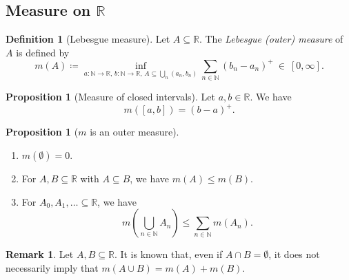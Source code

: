 \documentclass{article}
\theoremstyle{definition}
\newtheorem{proposition}[theorem]{Proposition}
\newtheorem{definition}[theorem]{Definition}
\newtheorem{remark}[theorem]{Remark}
\begin{document}
\subsection{Measure on $\mathbb{R}$}

\begin{definition}[Lebesgue measure]
  Let $A \subseteq \mathbb{R}$.
  The \emph{Lebesgue (outer) measure} of $A$ is defined by
  \begin{equation*}
    m (A) \coloneqq 
      \inf_{a : \mathbb{N} \to \mathbb{R},\, b : \mathbb{N} \to \mathbb{R},\, 
        A \subseteq \bigcup_{n} (a_n, b_n)}
      \sum_{n \in \mathbb{N}} (b_n - a_n)^+ \ \in \ [0, \infty].
  \end{equation*}
\end{definition}

\begin{proposition}[Measure of closed intervals]
  Let $a, b \in \mathbb{R}$. We have 
  \begin{equation*}
    m([a, b]) = (b - a)^+.
  \end{equation*}
\end{proposition}

\begin{proposition}[$m$ is an outer measure]\leavevmode
  \begin{enumerate}
    \item $m(\emptyset) = 0$.
    \item For $A, B \subseteq \mathbb{R}$ with $A \subseteq B$, we have $m(A) \leq m(B)$.
    \item For $A_0, A_1, \dots \subseteq \mathbb{R}$, we have 
      \begin{equation*}
        m\left( \bigcup_{n \in \mathbb{N}} A_n \right) 
          \leq \sum_{n \in \mathbb{N}} m(A_n).
      \end{equation*}
  \end{enumerate}
\end{proposition}

\begin{remark}
  Let $A, B \subseteq \mathbb{R}$. It is known that, 
  even if $A \cap B = \emptyset$, it does not necessarily imply that
  $m(A \cup B) = m(A) + m(B)$.
  \end{remark}

\end{document}
